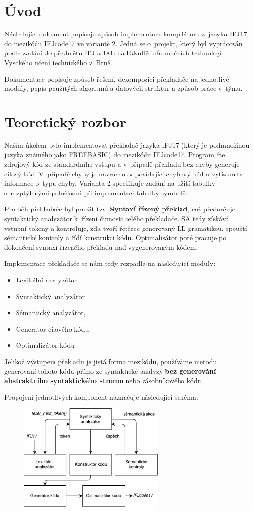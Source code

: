 \section{Úvod}
Následující dokument popisuje způsob implementace kompilátoru z~jazyka IFJ17 do mezikódu
IFJcode17 ve variantě 2. Jedná se o~projekt,
který byl vyprácován podle zadání do předmětů IFJ a IAL na Fakultě
informačních technologí Vysokého učení technického v~Brně.

Dokumentace popisuje způsob řešení, dekompozici překladače na jednotlivé moduly,
popis použitých algoritmů a datových struktur a způsob práce v~týmu.

\section{Teoretický rozbor}
Naším úkolem bylo implementovat překladač jazyka IFJ17 (který je podmnožinou jazyka známého jako \mbox{FREEBASIC})
do mezikódu IFJcode17. Program čte zdrojový kód ze standardního vstupu a v~případě překladu bez chyby generuje cílový
kód. V~případě chyby je navrácen odpovídající chybový kód a vytisknuta informace o~typu chyby. Varianta 2 specifikuje
zadání na užití tabulky s~rozptýlenými položkami při implementaci tabulky symbolů.

Pro běh překladače byl použit tzv. \textbf{Syntaxí řízený překlad}, což předurčuje syntaktický analyzátor k~řízení činnosti
celého překladače. SA tedy získává vstupní tokeny a kontroluje, zda tvoří řetězec generovaný
LL gramatikou, spouští sémantické kontroly a řídí konstrukci kódu.
Optimalizátor poté pracuje po dokončení syntaxí řízeného překladu nad vygenerovaným kódem.

Implementace překladače se nám tedy rozpadla na následující moduly:
\begin{itemize}
    \item Lexikální analyzátor
    \item Syntaktický analyzátor
    \item Sémantický analyzátor,
    \item Generátor cílového kódu
    \item Optimalizátor kódu
\end{itemize}

Jelikož výstupem překladu je jistá forma mezikódu, používáme metodu generování tohoto kódu přímo ze syntaktické analýzy \textbf{bez generování abstraktního syntaktického stromu} nebo zásobníkového kódu.

Propojení jednotlivých komponent naznačuje následující schéma:
\vspace*{4px}
\begin{figure}[htbp]
	\centering
	\includegraphics[width=0.65\textwidth, angle=0]{src/assets/structure.pdf}
\end{figure}